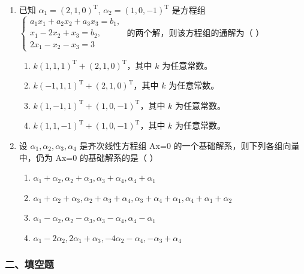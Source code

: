 \documentclass[12pt, a4paper]{ctexart}
\begin{document}
\begin{enumerate}
    \item 已知 $ \alpha_1 = (2, 1, 0)^\mathrm{T} $, $ \alpha_2 = (1, 0, -1)^\mathrm{T} $ 是方程组 $ \begin{cases} a_1 x_1 + a_2 x_2 + a_3 x_3 = b_1, \\ x_1 - 2 x_2 + x_3 = b_2, \\ 2 x_1 - x_2 - x_3 = 3 \end{cases} $ 的两个解，则该方程组的通解为（ \underline{\hspace{1cm}} ）
    \begin{enumerate}[label=(\Alph*)]
        \item $ k(1, 1, 1)^\mathrm{T} + (2, 1, 0)^\mathrm{T} $，其中 $ k $ 为任意常数。
        \item $ k(-1, 1, 1)^\mathrm{T} + (2, 1, 0)^\mathrm{T} $，其中 $ k $ 为任意常数。
        \item $ k(1, -1, 1)^\mathrm{T} + (1, 0, -1)^\mathrm{T} $，其中 $ k $ 为任意常数。
        \item $ k(1, 1, -1)^\mathrm{T} + (1, 0, -1)^\mathrm{T} $，其中 $ k $ 为任意常数。
    \end{enumerate}

    \item 设 $ \alpha_{1}, \alpha_{2}, \alpha_{3}, \alpha_{4} $ 是齐次线性方程组 Ax=0 的一个基础解系，则下列各组向量中，仍为 Ax=0 的基础解系的是（ \underline{\hspace{1cm}} ）
    \begin{enumerate}[label=(\Alph*)]
        \item $ \alpha_{1}+\alpha_{2},\alpha_{2}+\alpha_{3},\alpha_{3}+\alpha_{4},\alpha_{4}+\alpha_{1} $
        \item $ \alpha_{1}+\alpha_{2}+\alpha_{3},\alpha_{2}+\alpha_{3}+\alpha_{4},\alpha_{3}+\alpha_{4}+\alpha_{1},\alpha_{4}+\alpha_{1}+\alpha_{2} $
        \item $ \alpha_{1}-\alpha_{2},\alpha_{2}-\alpha_{3},\alpha_{3}-\alpha_{4},\alpha_{4}-\alpha_{1} $
        \item $ \alpha_{1}-2\alpha_{2},2\alpha_{1}+\alpha_{3},-4\alpha_{2}-\alpha_{4},-\alpha_{3}+\alpha_{4} $
    \end{enumerate}
\end{enumerate}

\subsubsection*{二、填空题}
\end{document}
